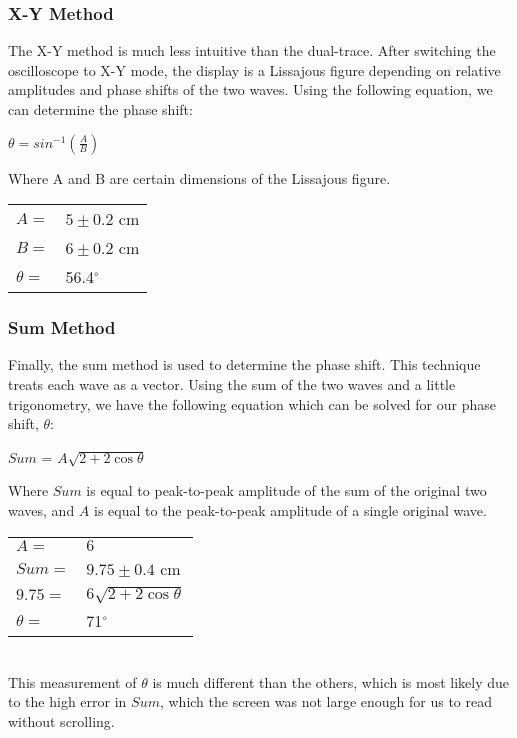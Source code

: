 \documentclass[a4paper,12pt]{article}
\begin{document}
\subsubsection{X-Y Method}
The X-Y method is much less intuitive than the dual-trace. After
switching the oscilloscope to X-Y mode, the display is a Lissajous
figure depending on relative amplitudes and phase shifts of the two
waves. Using the following equation, we can determine the phase shift:

\begin{center}
  $\theta = sin^{-1}(\frac{A}{B})$
\end{center}

Where A and B are certain dimensions of the Lissajous figure.

\begin{tabular}{l l}
  $A = $ & $5 \pm 0.2$ cm \\
  $B = $ & $6 \pm 0.2$ cm \\
  $\theta = $ & 56.4$^{\circ}$ \\
\end{tabular}


\subsubsection{Sum Method}
Finally, the sum method is used to determine the phase shift. This
technique treats each wave as a vector. Using the sum of the two waves
and a little trigonometry, we have the following equation which can be
solved for our phase shift, $\theta$: 

\begin{center}
  $Sum$ = $A\sqrt{2 + 2\cos\theta}$
\end{center}

Where $Sum$ is equal to peak-to-peak amplitude of the sum of the
original two waves, and $A$ is equal to the peak-to-peak amplitude of
a single original wave. \\

\begin{tabular}{l l}
  $A = $ & $6$ \\
  $Sum = $ & $9.75 \pm 0.4$ cm \\
  $9.75 = $ & $6\sqrt{2 + 2\cos\theta}$ \\
  $\theta = $ & 71$^{\circ}$ \\
\end{tabular} \\

This measurement of $\theta$ is much different than the others, which
is most likely due to the high error in $Sum$, which the screen was
not large enough for us to read without scrolling.
\end{document}
